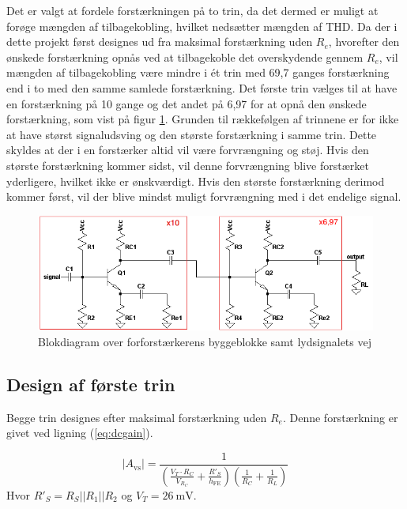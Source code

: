 Det er valgt at fordele forstærkningen på to trin, da det dermed er muligt at forøge mængden af tilbagekobling, hvilket nedsætter mængden af THD. Da der i dette projekt først designes ud fra maksimal forstærkning uden $R_e$, hvorefter den ønskede forstærkning opnås ved at tilbagekoble det overskydende gennem $R_e$, vil mængden af tilbagekobling være mindre i ét trin med 69,7 ganges forstærkning end i to med den samme samlede forstærkning.
Det første trin vælges til at have en forstærkning på 10 gange og det andet på 6,97 for at opnå den ønskede forstærkning, som vist på figur \ref{blok_forforstaerker}. Grunden til rækkefølgen af trinnene er for ikke at have størst signaludsving og den største forstærkning i samme trin. Dette skyldes at der i en forstærker altid vil være forvrængning og støj. Hvis den største forstærkning kommer sidst, vil denne forvrængning blive forstærket yderligere, hvilket ikke er ønskværdigt. Hvis den største forstærkning derimod kommer først, vil der blive mindst muligt forvrængning med i det endelige signal.

\begin{figure}[h]
\centering
\includegraphics[scale=.6]{teknisk/forforstaerker/blok_forforstaerker.png}
\caption{Blokdiagram over forforstærkerens byggeblokke samt lydsignalets vej}
\label{blok_forforstaerker}
\end{figure}



\subsection*{Design af første trin}
Begge trin designes efter maksimal forstærkning uden $R_e$. Denne forstærkning er givet ved ligning (\ref{eq:dcgain}).

\begin{equation}
|A_{\mathrm{vs}}|=\frac{1}{\left(\frac{V_T \cdot R_C}{V_{R_C}}+\frac{R'_S}{h_\mathrm{FE}}\right) \left(\frac{1}{R_C}+\frac{1}{R_L}\right)}
\label{eq:dcgain}
\end{equation}
Hvor $R'_S = R_S||R_1||R_2$ og $V_T = 26~\mathrm{mV}$.

